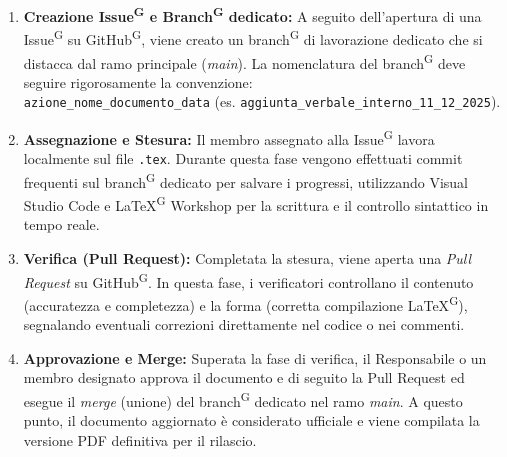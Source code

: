 \documentclass[a4paper, 11pt]{article}
\begin{document}
\begin{enumerate}
    \item \textbf{Creazione Issue\textsuperscript{G} e Branch\textsuperscript{G} dedicato:} 
    A seguito dell'apertura di una Issue\textsuperscript{G} su GitHub\textsuperscript{G}, viene creato un branch\textsuperscript{G} di lavorazione dedicato che si distacca dal ramo principale (\textit{main}). La nomenclatura del branch\textsuperscript{G} deve seguire rigorosamente la convenzione: \\
    \texttt{azione\_nome\_documento\_data} (es. \texttt{aggiunta\_verbale\_interno\_11\_12\_2025}).

    \item \textbf{Assegnazione e Stesura:} 
    Il membro assegnato alla Issue\textsuperscript{G} lavora localmente sul file \texttt{.tex}. Durante questa fase vengono effettuati commit frequenti sul branch\textsuperscript{G} dedicato per salvare i progressi, utilizzando Visual Studio Code e LaTeX\textsuperscript{G} Workshop per la scrittura e il controllo sintattico in tempo reale.

    \item \textbf{Verifica (Pull Request):} 
    Completata la stesura, viene aperta una \textit{Pull Request} su GitHub\textsuperscript{G}. In questa fase, i verificatori controllano il contenuto (accuratezza e completezza) e la forma (corretta compilazione LaTeX\textsuperscript{G}), segnalando eventuali correzioni direttamente nel codice o nei commenti.

    \item \textbf{Approvazione e Merge:} 
    Superata la fase di verifica, il Responsabile o un membro designato approva il documento e di seguito la Pull Request ed esegue il \textit{merge} (unione) del branch\textsuperscript{G} dedicato nel ramo \textit{main}. A questo punto, il documento aggiornato è considerato ufficiale e viene compilata la versione PDF definitiva per il rilascio.
\end{enumerate}
\end{document}
